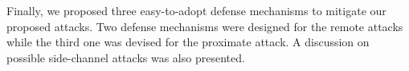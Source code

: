 Finally, we proposed three easy-to-adopt defense mechanisms to mitigate our proposed attacks. Two defense mechanisms were designed for the remote attacks while the third one was devised for the proximate attack. A discussion on possible side-channel attacks was also presented. 


